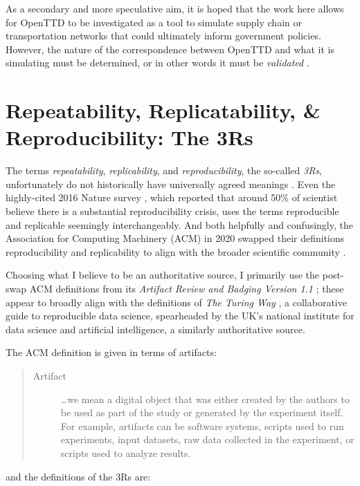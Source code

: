 \documentclass[logo,msc,dsti]{style/infthesis}    %
\begin{document}
As a secondary and more speculative aim, it is hoped that the work here allows for OpenTTD to be investigated as a tool to simulate supply chain or transportation networks that could ultimately inform government policies. However, the nature of the correspondence between OpenTTD and what it is simulating must be determined, or in other words it must be \emph{validated} \cite{doi:10.1177/1046878198291003}.

\section{Repeatability, Replicatability, \& Reproducibility: The 3Rs}
\label{section:define-3rs}

The terms \emph{repeatability}, \emph{replicability}, and \emph{reproducibility}, the so-called \emph{3Rs}, unfortunately do not historically have universally agreed meanings \cite{plesser_reproducibility_2018}. Even the highly-cited 2016 Nature survey \cite{baker20161}, which reported that around 50\% of scientist believe there is a substantial reproducibility crisis, uses the terms reproducible and replicable seemingly interchangeably. And both helpfully and confusingly, the Association for Computing Machinery (ACM) in 2020 swapped their definitions reproducibility and replicability to align with the broader scientific community \cite{association_for_computing_machiner_new_2020}.

Choosing what I believe to be an authoritative source, I primarily use the post-swap ACM definitions from its \emph{Artifact Review and Badging Version 1.1} \cite{association_for_computing_machiner_artifact_2020}; these appear to broadly align with the definitions of \emph{The Turing Way} \cite{turingway2022}, a collaborative guide to reproducible data science, spearheaded by the UK's national institute for data science and artificial intelligence, a similarly authoritative source.

The ACM definition is given in terms of artifacts:

\begin{quote}
\begin{description}
\item[Artifact]

\ldots we mean a digital object that was either created by the authors to be used as part of the study or generated by the experiment itself. For example, artifacts can be software systems, scripts used to run experiments, input datasets, raw data collected in the experiment, or scripts used to analyze results.
\end{description}
\end{quote}
and the definitions of the 3Rs are:
\end{document}
